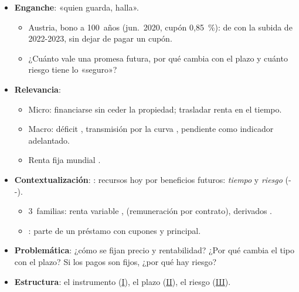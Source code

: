 \documentclass{article}
\begin{document}
\cabecerarepaso
\begin{columnas}

\begin{itemize}
\item \textbf{Enganche}: «quien guarda, halla».
  \begin{itemize}
  \item Austria, bono a 100~años (jun.\ 2020, cupón 0,85~\%): de  con la subida de 2022-2023, sin dejar de pagar un cupón.
  \item ¿Cuánto vale una promesa futura, por qué cambia con el plazo y cuánto riesgo tiene lo «seguro»?
  \end{itemize}
\item \textbf{Relevancia}:
  \begin{itemize}
  \item Micro: financiarse sin ceder la propiedad; trasladar renta en el tiempo.
  \item Macro: déficit , transmisión por la curva , pendiente como indicador adelantado.
  \item Renta fija mundial .
  \end{itemize}
\item \textbf{Contextualización}: : recursos hoy por beneficios futuros: \emph{tiempo} y \emph{riesgo} (--).
  \begin{itemize}
  \item 3~familias: renta variable ,  (remuneración por contrato), derivados .
  \item {}: parte de un préstamo con cupones y principal.
  \end{itemize}
\item \textbf{Problemática}: ¿cómo se fijan precio y rentabilidad? ¿Por qué cambia el tipo con el plazo? Si los pagos son fijos, ¿por qué hay riesgo?
\item \textbf{Estructura}: el instrumento (\hyperref[rep:I]{I}), el plazo (\hyperref[rep:II]{II}), el riesgo (\hyperref[rep:III]{III}).
\end{itemize}


\end{columnas}
\end{document}
